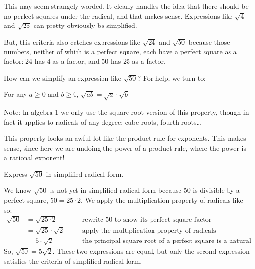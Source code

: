 This may seem strangely worded. It clearly handles the idea that there should be no perfect squares under the radical, and that makes sense. Expressions like $\sqrt{4}$ and $\sqrt{25}$ can pretty obviously be simplified.

But, this criteria also catches expressions like $\sqrt{24}$ and $\sqrt{50}$ because those numbers, neither of which is a perfect square, each have a perfect square as a factor: 24 has 4 as a factor, and 50 has 25 as a factor.

How can we simplify an expression like $\sqrt{50}$? For help, we turn to:

\begin{boxeddef}
\begin{center}
For any $a \geq 0$ and $b \geq 0$, $\sqrt{ab} = \sqrt{a} \cdot \sqrt{b}$
\end{center}


\bigskip\noindent
Note: In algebra 1 we only use the square root version of this property, though in fact it applies to radicals of any degree: cube roots, fourth roots\ldots
\end{boxeddef}

This property looks an awful lot like the product rule for exponents. This makes sense, since here we are undoing the power of a product rule, where the power is a rational exponent!

\begin{boxedex}
Express $\sqrt{50}$ in simplified radical form.

\bigskip{}
We know $\sqrt{50}$ is not yet in simplified radical form because 50 is divisible by a perfect square, $50 = 25 \cdot 2$. We apply the multiplication property of radicals like so:
\[
\begin{aligned}
\sqrt{50} 	&= \sqrt{25 \cdot 2}
&& \quad \text{rewrite 50 to show its perfect square factor}\\
			&= \sqrt{25} \cdot \sqrt{2}
&& \quad \text{apply the multiplication property of radicals}\\
			&= 5 \cdot \sqrt{2}
&& \quad \text{the principal square root of a perfect square is a natural number}
\end{aligned}
\]
So, $\sqrt{50} = 5\sqrt{2}$. These two expressions are equal, but only the second expression satisfies the criteria of simplified radical form.
\end{boxedex}

